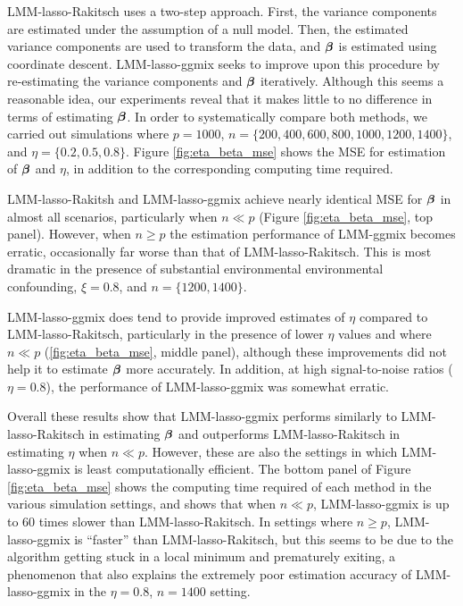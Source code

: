 LMM-lasso-Rakitsch uses a two-step approach. First, the variance components are estimated under the assumption of a null model. Then, the estimated variance components are used to transform the data, and $\boldsymbol{\beta}{}$ is estimated using coordinate descent. LMM-lasso-ggmix seeks to improve upon this procedure by re-estimating the variance components and $\boldsymbol{\beta}{}$ iteratively. Although this seems a reasonable idea, our experiments reveal that it makes little to no difference in terms of estimating $\boldsymbol{\beta}{}$. In order to systematically compare both methods, we carried out simulations where $p = 1000$, $n = \{200, 400, 600, 800, 1000, 1200, 1400\}$, and $\eta = \{0.2, 0.5, 0.8\}$. Figure \ref{fig:eta_beta_mse} shows the MSE for estimation of $\boldsymbol{\beta}{}$ and $\eta$, in addition to the corresponding computing time required. 

LMM-lasso-Rakitsh and LMM-lasso-ggmix achieve nearly identical MSE for $\boldsymbol{\beta}{}$ in almost all scenarios, particularly when $n \ll p$ (Figure \ref{fig:eta_beta_mse}, top panel). However, when $n \ge p$ the estimation performance of LMM-ggmix becomes erratic, occasionally far worse than that of LMM-lasso-Rakitsch. This is most dramatic in the presence of substantial environmental environmental confounding, $\xi = 0.8$, and $n = \{1200, 1400\}$. 

LMM-lasso-ggmix does tend to provide improved estimates of $\eta$ compared to LMM-lasso-Rakitsch, particularly in the presence of lower $\eta$ values and where $n \ll p$ (\ref{fig:eta_beta_mse}, middle panel), although these improvements did not help it to estimate $\boldsymbol{\beta}{}$ more accurately. In addition, at high signal-to-noise ratios ($\eta=0.8$), the performance of LMM-lasso-ggmix was somewhat erratic.

Overall these results show that LMM-lasso-ggmix performs similarly to LMM-lasso-Rakitsch in estimating $\boldsymbol{\beta}{}$ and outperforms LMM-lasso-Rakitsch in estimating $\eta$ when $n \ll p$. However, these are also the settings in which LMM-lasso-ggmix is least computationally efficient. The bottom panel of Figure \ref{fig:eta_beta_mse} shows the computing time required of each method in the various simulation settings, and shows that when $n \ll p$, LMM-lasso-ggmix is up to 60 times slower than LMM-lasso-Rakitsch. In settings where $n \ge p$, LMM-lasso-ggmix is ``faster'' than LMM-lasso-Rakitsch, but this seems to be due to the algorithm getting stuck in a local minimum and prematurely exiting, a phenomenon that also explains the extremely poor estimation accuracy of LMM-lasso-ggmix in the $\eta=0.8$, $n=1400$ setting.

